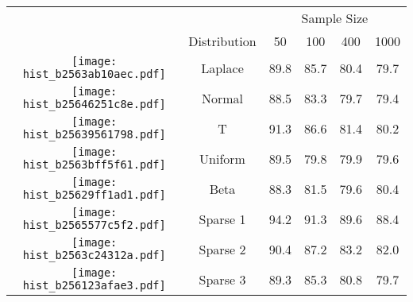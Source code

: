 
\begin{tabular}[t]{>{}cccccc}
\toprule
\multicolumn{2}{c}{  } & \multicolumn{4}{c}{Sample Size} \\
\cmidrule(l{3pt}r{3pt}){3-6}
  & Distribution & 50 & 100 & 400 & 1000\\
\midrule
\texttt{[image: hist\_b2563ab10aec.pdf]} & Laplace & 89.8 & 85.7 & 80.4 & 79.7\\
\texttt{[image: hist\_b25646251c8e.pdf]} & Normal & 88.5 & 83.3 & 79.7 & 79.4\\
\texttt{[image: hist\_b25639561798.pdf]} & T & 91.3 & 86.6 & 81.4 & 80.2\\
\texttt{[image: hist\_b2563bff5f61.pdf]} & Uniform & 89.5 & 79.8 & 79.9 & 79.6\\
\texttt{[image: hist\_b25629ff1ad1.pdf]} & Beta & 88.3 & 81.5 & 79.6 & 80.4\\
\texttt{[image: hist\_b2565577c5f2.pdf]} & Sparse 1 & 94.2 & 91.3 & 89.6 & 88.4\\
\texttt{[image: hist\_b2563c24312a.pdf]} & Sparse 2 & 90.4 & 87.2 & 83.2 & 82.0\\
\texttt{[image: hist\_b256123afae3.pdf]} & Sparse 3 & 89.3 & 85.3 & 80.8 & 79.7\\
\bottomrule
\end{tabular}

